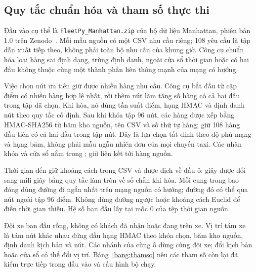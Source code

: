 \subsection{Quy tắc chuẩn hóa và tham số thực thi}

Đầu vào cụ thể là \texttt{FleetPy\_Manhattan.zip} của bộ dữ liệu Manhattan,
phiên bản 1.0 trên Zenodo~\cite{fleetpydata2025}. Mỗi mẫu nguồn có một CSV
nhu cầu riêng; 108 yêu cầu là tập dẫn xuất tiếp theo, không phải toàn bộ
nhu cầu của khung giờ. Công cụ chuẩn hóa loại hàng sai định dạng, trùng
định danh, ngoài cửa sổ thời gian hoặc có hai đầu không thuộc cùng một
thành phần liên thông mạnh của mạng có hướng.

Việc chọn nút ưu tiên giữ được nhiều hàng nhu cầu. Công cụ bắt đầu từ cặp
điểm có nhiều hàng hợp lệ nhất, rồi thêm nút làm tăng số hàng có cả hai
đầu trong tập đã chọn. Khi hòa, nó dùng tần suất điểm, hạng HMAC và định
danh nút theo quy tắc cố định. Sau khi khóa tập 96 nút, các hàng được xếp
bằng HMAC-SHA256 từ băm kho nguồn, tên CSV và số thứ tự hàng; giữ 108 hàng
đầu tiên có cả hai đầu trong tập nút. Đây là lựa chọn tất định theo độ phủ
mạng và hạng băm, không phải mẫu ngẫu nhiên đơn của mọi chuyến taxi.
Các nhãn khóa và cửa sổ nằm trong ;
 giữ liên kết tới hàng nguồn.

Thời gian đến giữ khoảng cách trong CSV và được dịch về đầu ô; giây được
đổi sang mili giây bằng quy tắc làm tròn về số chẵn khi hòa. Mỗi cung trong
bao đóng dùng đường đi ngắn nhất trên mạng nguồn có hướng; đường đó có thể
qua nút ngoài tập 96 điểm. Không dùng đường ngược hoặc khoảng cách Euclid
để điền thời gian thiếu. Hệ số ban đầu lấy tại mốc 0 của tệp thời gian nguồn.

Đội xe ban đầu rỗng, không có khách đã nhận hoặc đang trên xe. Vị trí tám
xe là tám nút khác nhau đứng đầu hạng HMAC theo khóa chọn, băm kho nguồn,
định danh kịch bản và nút. Các nhánh của cùng ô dùng cùng đội xe; đổi kịch
bản hoặc cửa sổ có thể đổi vị trí. Bảng~\ref{bang:thamso} nêu các tham số
còn lại đã kiểm trực tiếp trong đầu vào và cấu hình bộ chạy.

